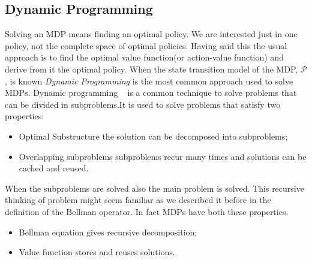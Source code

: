 \subsection{Dynamic Programming}
Solving an MDP means finding an optimal policy. We are interested just in one policy, not the complete space of optimal policies. Having said this the usual approach is to find the optimal value function(or action-value function) and derive from it the optimal policy. When the state transition model of the MDP, $\mathcal{P}$, is known \emph{Dynamic Programming} is the most common approach used to solve MDPs. Dynamic programming ~\cite{Bellman:DynamicProgramming} is a common technique to solve problems that can be divided in subproblems.It is used to solve problems that satisfy two properties:
\begin{itemize}
\item Optimal Substructure \ie the solution can be decomposed into subproblems;
\item Overlapping subproblems \ie subproblems recur many times and solutions can be cached and reused.
\end{itemize}
When the subproblems are solved also the main problem is solved. This recursive thinking of problem might seem familiar as we described it before in the definition of the Bellman operator. In fact MDPs have both these properties.
\begin{itemize}
\item Bellman equation gives recursive decomposition;
\item Value function stores and reuses solutions.
\end{itemize}

